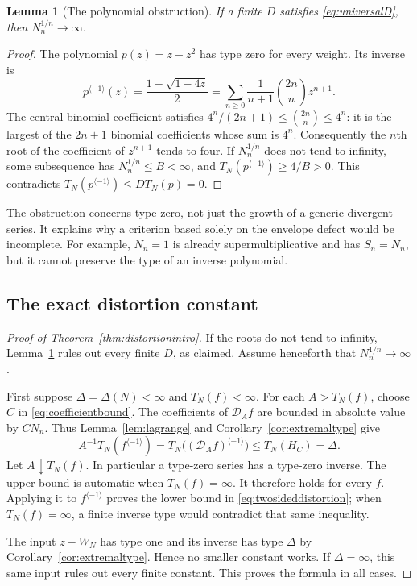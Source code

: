 \documentclass[11pt,a4paper]{article}
\numberwithin{equation}{section}
\newtheorem{lemma}[theorem]{Lemma}
\theoremstyle{definition}
\theoremstyle{remark}
\newcommand{\Type}{T_N}
\newcommand{\inv}[1]{#1^{\langle-1\rangle}}
\begin{document}
\begin{lemma}[The polynomial obstruction]
\label{lem:polynomial}
If a finite $D$ satisfies \eqref{eq:universalD}, then
$N_n^{1/n}\to\infty$.
\end{lemma}
\begin{proof}
The polynomial $p(z)=z-z^2$ has type zero for every weight. Its inverse is
\[
 \inv p(z)=\frac{1-\sqrt{1-4z}}2
 =\sum_{n\ge0}\frac1{n+1}\binom{2n}{n}z^{n+1}.
\]
The central binomial coefficient satisfies
$4^n/(2n+1)\le\binom{2n}{n}\le4^n$: it is the largest of the
$2n+1$ binomial coefficients whose sum is $4^n$. Consequently the $n$th
root of the coefficient of $z^{n+1}$ tends to four. If
$N_n^{1/n}$ does not tend to infinity, some subsequence has
$N_n^{1/n}\le B<\infty$, and
$\Type(\inv p)\ge4/B>0$. This contradicts
$\Type(\inv p)\le D\Type(p)=0$.
\end{proof}

The obstruction concerns type zero, not just the growth of a generic
divergent series. It explains why a criterion based solely on the envelope
defect would be incomplete. For example, $N_n=1$ is already
supermultiplicative and has $S_n=N_n$, but it cannot preserve the type of
an inverse polynomial.

\subsection{The exact distortion constant}

\begin{proof}[Proof of Theorem~\ref{thm:distortionintro}]
If the roots do not tend to infinity,
Lemma~\ref{lem:polynomial} rules out every finite $D$, as claimed.
Assume henceforth that $N_n^{1/n}\to\infty$.

First suppose $\Delta=\Delta(N)<\infty$ and $\Type(f)<\infty$.
For each $A>\Type(f)$, choose $C$ in
\eqref{eq:coefficientbound}. The coefficients of $\mathcal D_A f$
are bounded in absolute value by $CN_n$. Thus
Lemma~\ref{lem:lagrange} and Corollary~\ref{cor:extremaltype} give
\[
 A^{-1}\Type(\inv f)
 =\Type\bigl(\inv{(\mathcal D_A f)}\bigr)
 \le\Type(H_C)=\Delta.
\]
Let $A\downarrow\Type(f)$. In particular a type-zero series has a
type-zero inverse. The upper bound is automatic when $\Type(f)=\infty$.
It therefore holds for every $f$. Applying it to $\inv f$ proves the
lower bound in \eqref{eq:twosideddistortion}; when $\Type(f)=\infty$,
a finite inverse type would contradict that same inequality.

The input $z-W_N$ has type one and its inverse has type $\Delta$ by
Corollary~\ref{cor:extremaltype}. Hence no smaller constant works.
If $\Delta=\infty$, this same input rules out every finite constant.
This proves the formula in all cases.
\end{proof}
\end{document}
